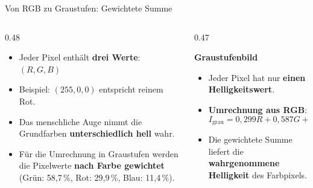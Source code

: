 {\begin{frame}{Von RGB zu Graustufen: Gewichtete Summe}
\begin{columns}[T]
\begin{column}{0.48\textwidth}
\begin{center}
\end{center}

\begin{itemize}
    \item Jeder Pixel enthält \textbf{drei Werte}:     \(    (R,G,B)    \)
    \item Beispiel:    \(    (255,0,0)    \)
    entspricht reinem Rot.
    \item Das menschliche Auge nimmt die Grundfarben \textbf{unterschiedlich hell} wahr.
    \item Für die Umrechnung in Graustufen werden die Pixelwerte \textbf{nach Farbe gewichtet} (Grün: 58{,}7\,\%, 
        Rot: 29{,}9\,\%,  Blau: 11{,}4\,\%).
\end{itemize}

\end{column}

\begin{column}{0.47\textwidth}

\textbf{Graustufenbild}
\begin{center}
\end{center}

\begin{itemize}
    \item Jeder Pixel hat nur \textbf{einen Helligkeitswert}.
    \item \textbf{Umrechnung aus RGB}:
    \[
    I_{\text{grau}}
    =0{,}299R
    +0{,}587G
    +0{,}114B
    \]
    \item Die gewichtete Summe liefert die \textbf{wahrgenommene Helligkeit} des Farbpixels.
\end{itemize}


\end{column}
\end{columns}
\end{frame}}
